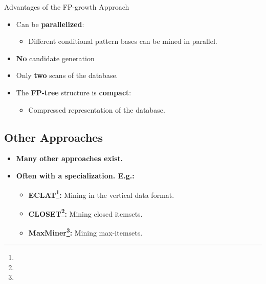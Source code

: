 \begin{frame}{Advantages of the FP-growth Approach}
	\begin{itemize}
		\item Can be \textbf{parallelized}:
		      \begin{itemize}
			      \item Different conditional pattern bases can be mined in parallel.
		      \end{itemize}
		\item \textbf{No} candidate generation
		\item Only \textbf{two} scans of the database.
		\item The \textbf{FP-tree} structure is \textbf{compact}:
		      \begin{itemize}
			      \item Compressed representation of the database.
		      \end{itemize}
	\end{itemize}
\end{frame}

\subsection{Other Approaches}

\begin{frame}
	\begin{itemize}
		\item \textbf{Many other approaches exist.}
		\item \textbf{Often with a specialization. E.g.:}
		      \begin{itemize}
			      \item \textbf{ECLAT\footnote{}:} Mining in the
			            vertical data format.
			      \item \textbf{CLOSET\footnote{}:} Mining closed itemsets.
			      \item \textbf{MaxMiner\footnote{}:} Mining max-itemsets.
		      \end{itemize}
	\end{itemize}
\end{frame}

